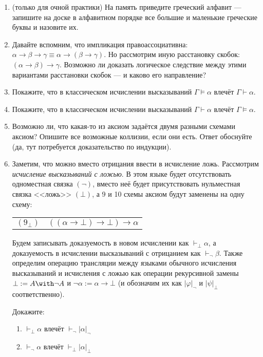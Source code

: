 \documentclass[10pt,a4paper,oneside]{article}
\begin{document}
\begin{enumerate}
\item (только для очной практики) На память приведите греческий алфавит --- запишите на доске в алфавитном порядке все большие и маленькие
греческие буквы и назовите их.
\item Давайте вспомним, что импликация правоассоциативна: $\alpha\rightarrow\beta\rightarrow\gamma \equiv \alpha\rightarrow(\beta\rightarrow\gamma)$.
Но рассмотрим иную расстановку скобок: $(\alpha\rightarrow\beta)\rightarrow\gamma$. Возможно ли доказать логическое следствие
между этими вариантами расстановки скобок --- и каково его направление?
\item Покажите, что в классическом исчислении высказываний $\Gamma \models \alpha$ влечёт $\Gamma \vdash \alpha$.
\item Покажите, что в классическом исчислении высказываний $\Gamma \vdash \alpha$ влечёт $\Gamma \models \alpha$.
\item Возможно ли, что какая-то из аксиом задаётся двумя разными схемами аксиом? Опишите все возможные коллизии, если они есть.
Ответ обоснуйте (да, тут потребуется доказательство по индукции).

\item Заметим, что можно вместо отрицания ввести в исчисление ложь. Рассмотрим \emph{исчисление высказываний с ложью}.
В этом языке будет отсутствовать одноместная связка $(\neg)$, вместо неё будет присутствовать нульместная
связка <<ложь>> $(\bot)$, а 9 и 10 схемы аксиом будут заменены на одну схему:

\begin{tabular}{ll}
$(9_\bot)$ & $((\alpha\rightarrow\bot)\rightarrow\bot)\rightarrow\alpha$
\end{tabular}

Будем записывать доказуемость в новом исчислении как $\vdash_\bot \alpha$, а доказуемость в исчислении высказываний
с отрицанием как $\vdash_\neg \beta$. Также определим операцию трансляции между языками обычного исчисления высказываний и исчисления с ложью
как операции рекурсивной замены $\bot := A \with \neg A$ и $\neg \alpha := \alpha \rightarrow \bot$ (и обозначим их
как $|\varphi|_\neg$ и $|\psi|_\bot$ соответственно).

Докажите:
\begin{enumerate}
\item $\vdash_\bot \alpha$ влечёт $\vdash_\neg |\alpha|_\neg$
\item $\vdash_\neg \alpha$ влечёт $\vdash_\bot |\alpha|_\bot$
\end{enumerate}


\end{enumerate}
\end{document}

